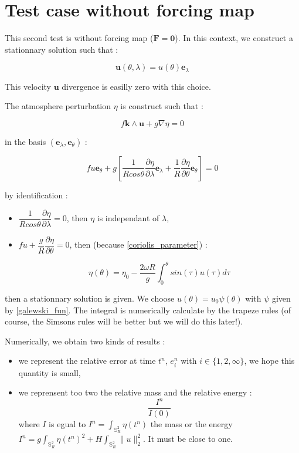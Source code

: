 \documentclass[10pt,a4paper]{amsart}
\def\gint{\displaystyle\int}
\begin{document}
\section{Test case without forcing map}

This second test is without forcing map ($\mathbf{F} = \mathbf{0}$). In this context, we construct a stationnary solution such that :

$$\mathbf{u}(\theta, \lambda) = u(\theta) \mathbf{e}_{\lambda}$$

This velocity $ \mathbf{u}$ divergence is easilly zero with this choice.

The atmosphere perturbation $\eta$ is construct such that :

\begin{equation}
f \mathbf{k} \wedge \mathbf{u} + g \nabla \eta = 0
\end{equation} 

in the basis $(\mathbf{e}_{\lambda}, \mathbf{e}_{\theta})$ :

\begin{equation}
f u \mathbf{e}_{\theta} + g \left[ \dfrac{1}{R cos \theta} \dfrac{\partial \eta}{\partial \lambda} \mathbf{e}_{\lambda} + \dfrac{1}{R}\dfrac{\partial \eta}{\partial \theta} \mathbf{e}_{\theta} \right] = 0
\end{equation}

by identification :

\begin{itemize}
\item $\dfrac{1}{R cos \theta} \dfrac{\partial \eta}{\partial \lambda} = 0$, then $\eta$ is independant of $\lambda$,

\item $f u + \dfrac{g}{R} \dfrac{\partial \eta}{\partial \theta} = 0$, then (because \eqref{coriolis_parameter}) :

\begin{equation}
\eta (\theta ) = \eta_0 - \dfrac{2 \omega R}{g} \gint_0^{\theta} sin(\tau) u(\tau) d \tau
\end{equation} 
\end{itemize}

then a stationnary solution is given. We choose $u(\theta) = u_0 \psi( \theta )$ with $\psi$ given by \eqref{galewski_fun}. The integral is numerically calculate by the trapeze rules (of course, the Simsons rules will be better but we will do this later!).

Numerically, we obtain two kinds of results :
\begin{itemize}
\item we represent the relative error at time $t^n$, $e_i^n$ with $i \in \lbrace 1, 2, \infty \rbrace$, we hope this quantity is small,
\item we reprensent too two the relative mass and the relative energy :
\begin{equation}
\dfrac{I^n}{I(0)}
\end{equation}
where $I$ is egual to $I^n = \gint_{\mathbb{S}_R^2} \eta (t^n)$ the mass or the energy $I^n = g \gint_{\mathbb{S}_R^2} \eta (t^n)^2 + H \gint_{\mathbb{S}_R^2} \|u \|_2^2$. It must be close to one.
\end{itemize} 
\end{document}
